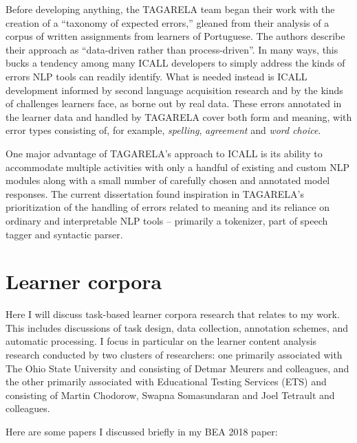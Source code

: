 Before developing anything, the TAGARELA team began their work with the creation of a ``taxonomy of expected errors,'' gleaned from their analysis of a corpus of written assignments from learners of Portuguese. The authors describe their approach as ``data-driven rather than process-driven''. In many ways, this bucks a tendency among many ICALL developers to simply address the kinds of errors NLP tools can readily identify. What is needed instead is ICALL development informed by second language acquisition research and by the kinds of challenges learners face, as borne out by real data. These errors annotated in the learner data and handled by TAGARELA cover both form and meaning, with error types consisting of, for example, \textit{spelling}, \textit{agreement} and \textit{word choice}.

One major advantage of TAGARELA's approach to ICALL is its ability to accommodate multiple activities with only a handful of existing and custom NLP modules along with a small number of carefully chosen and annotated model responses. The current dissertation found inspiration in TAGARELA's prioritization of the handling of errors related to meaning and its reliance on ordinary and interpretable NLP tools -- primarily a tokenizer, part of speech tagger and syntactic parser. 

\section{Learner corpora}
\label{section:learnerCorpora}
Here I will discuss task-based learner corpora research that relates to my work. This includes discussions of task design, data collection, annotation schemes, and automatic processing. I focus in particular on the learner content analysis research conducted by two clusters of researchers: one primarily associated with The Ohio State University and consisting of Detmar Meurers and colleagues, and the other primarily associated with Educational Testing Services (ETS) and consisting of Martin Chodorow, Swapna Somasundaran and Joel Tetrault and colleagues. 

Here are some papers I discussed briefly in my BEA 2018 paper:

\cite{leacock:ea:14}

\cite{kyle2015automatically}

\cite{weigle2013english}

\cite{amaral:meurers:user:07}


